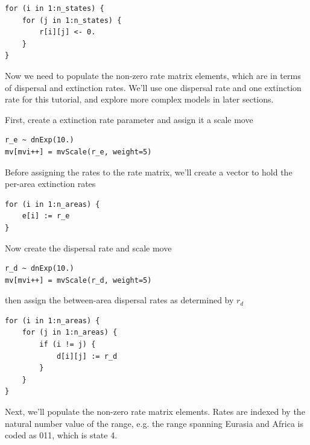 \begin{snugshade}
\begin{lstlisting}
for (i in 1:n_states) {
    for (j in 1:n_states) {
        r[i][j] <- 0.
    }
}
\end{lstlisting}
\end{snugshade}

Now we need to populate the non-zero rate matrix elements, which are in terms of dispersal and extinction rates. We'll use one dispersal rate and one extinction rate for this tutorial, and explore more complex models in later sections.

First, create a extinction rate parameter and assign it a scale move

\begin{snugshade}
\begin{lstlisting}
r_e ~ dnExp(10.)
mv[mvi++] = mvScale(r_e, weight=5)
\end{lstlisting}
\end{snugshade}

Before assigning the rates to the rate matrix, we'll create a vector to hold the per-area extinction rates 

\begin{snugshade}
\begin{lstlisting}
for (i in 1:n_areas) {
    e[i] := r_e
}
\end{lstlisting}
\end{snugshade}

Now create the dispersal rate and scale move

\begin{snugshade}
\begin{lstlisting}
r_d ~ dnExp(10.)
mv[mvi++] = mvScale(r_d, weight=5)
\end{lstlisting}
\end{snugshade}

then assign the between-area dispersal rates as determined by {\tt $r_d$}

\begin{snugshade}
\begin{lstlisting}
for (i in 1:n_areas) {
    for (j in 1:n_areas) {
        if (i != j) {
            d[i][j] := r_d
        }
    }
}
\end{lstlisting}
\end{snugshade}

Next, we'll populate the non-zero rate matrix elements.
Rates are indexed by the natural number value of the range, e.g. the range spanning Eurasia and Africa is coded as 011, which is state 4.

